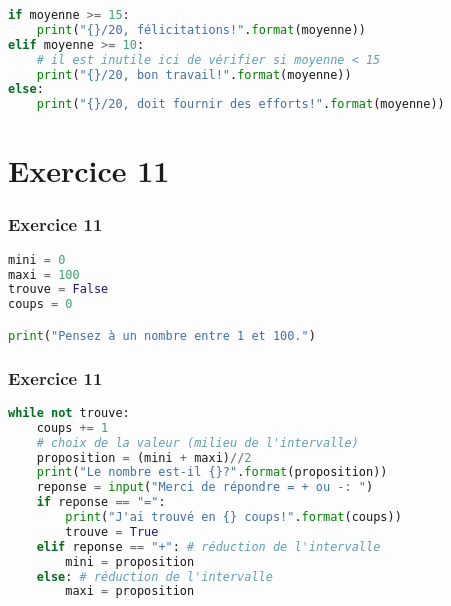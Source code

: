 \documentclass[svgnames,11pt]{beamer}
\begin{document}
\begin{frame}[fragile]
    \begin{center}
    \begin{lstlisting}[language=Python , basicstyle=\ttfamily\small, xleftmargin=1em, xrightmargin=0.5em]
if moyenne >= 15:
    print("{}/20, félicitations!".format(moyenne))
elif moyenne >= 10:
    # il est inutile ici de vérifier si moyenne < 15
    print("{}/20, bon travail!".format(moyenne))
else:
    print("{}/20, doit fournir des efforts!".format(moyenne))
\end{lstlisting}
    \label{CODE}
    \end{center}
    
    \end{frame}
\section{Exercice 11}
\begin{frame}[fragile]
    \frametitle{Exercice 11}

\begin{center}
\begin{lstlisting}[language=Python , basicstyle=\ttfamily\small, xleftmargin=1em, xrightmargin=1em]
mini = 0
maxi = 100
trouve = False
coups = 0

print("Pensez à un nombre entre 1 et 100.")
\end{lstlisting}
\label{CODE}
\end{center}  

\end{frame}
\begin{frame}[fragile]
    \frametitle{Exercice 11}

\begin{center}
\begin{lstlisting}[language=Python , basicstyle=\ttfamily\small, xleftmargin=0.em, xrightmargin=-1em]
while not trouve:
    coups += 1
    # choix de la valeur (milieu de l'intervalle)
    proposition = (mini + maxi)//2
    print("Le nombre est-il {}?".format(proposition))
    reponse = input("Merci de répondre = + ou -: ")
    if reponse == "=":
        print("J'ai trouvé en {} coups!".format(coups))
        trouve = True
    elif reponse == "+": # réduction de l'intervalle
        mini = proposition
    else: # réduction de l'intervalle
        maxi = proposition
\end{lstlisting}
\label{CODE}
\end{center}  

\end{frame}
\end{document}
